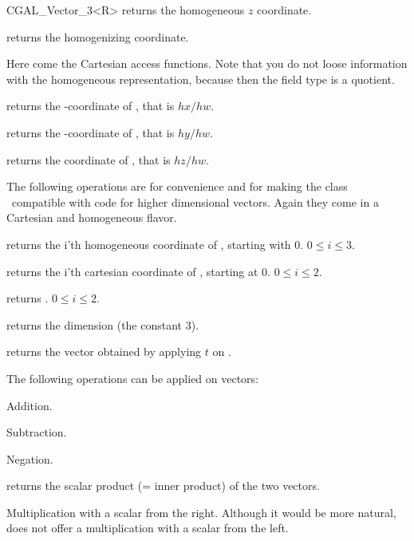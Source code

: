 \begin {classtemplate} {CGAL_Vector_3<R>}
       {returns the homogeneous $z$ coordinate.}

       {returns the homogenizing  coordinate.}

Here come the Cartesian access functions. Note that you do not loose
information with the homogeneous representation, because then the field
type is a quotient.


       {returns the -coordinate of \var, that is $hx/hw$.}

       {returns the -coordinate of \var, that is $hy/hw$.}

       {returns the  coordinate of \var, that is $hz/hw$.}

The following operations are for convenience and for making the
class \classname\ compatible with code for higher dimensional vectors.
Again they come in a Cartesian and homogeneous flavor.

       {returns the i'th homogeneous coordinate of \var, starting with 0.
        \precond $0\leq i \leq 3$.}

       {returns the i'th cartesian coordinate of \var, starting at 0.
        \precond $0\leq i \leq 2$.}

       {returns  .
        \precond $0\leq i \leq 2$.}

       {returns the dimension (the constant 3).}

       {returns the vector obtained by applying $t$ on \var.}

The following operations can be applied on vectors:

       {Addition.}

       {Subtraction.}

       {Negation.}

       {returns the scalar product (= inner product) of the two vectors.}


       {Multiplication with a scalar from the right. Although it would
        be more natural, \cgal does not offer a multiplication with a 
        scalar from the left.}



\end{classtemplate}

